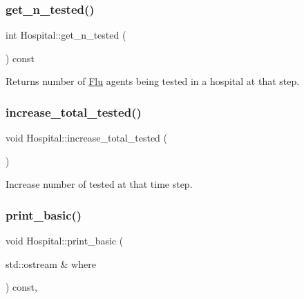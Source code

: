\mbox{\label{classHospital_ab7c68212de4e44986c8de732af160221}} 
\subsubsection{\texorpdfstring{get\+\_\+n\+\_\+tested()}{get\_n\_tested()}}
{\footnotesize\ttfamily int Hospital\+::get\+\_\+n\+\_\+tested (\begin{DoxyParamCaption}{ }\end{DoxyParamCaption}) const\hspace{0.3cm}{\ttfamily [inline]}}



Returns number of \hyperlink{classFlu}{Flu} agents being tested in a hospital at that step. 

\mbox{\label{classHospital_a2661ef21ce8561a28849d1be40e2ee50}} 
\subsubsection{\texorpdfstring{increase\+\_\+total\+\_\+tested()}{increase\_total\_tested()}}
{\footnotesize\ttfamily void Hospital\+::increase\+\_\+total\+\_\+tested (\begin{DoxyParamCaption}{ }\end{DoxyParamCaption})\hspace{0.3cm}{\ttfamily [inline]}}



Increase number of tested at that time step. 

\mbox{\label{classHospital_a3a1963886a9974663c2a3e82817f1a2b}} 
\subsubsection{\texorpdfstring{print\+\_\+basic()}{print\_basic()}}
{\footnotesize\ttfamily void Hospital\+::print\+\_\+basic (\begin{DoxyParamCaption}\item[{std\+::ostream \&}]{where }\end{DoxyParamCaption}) const\hspace{0.3cm}{\ttfamily [override]}, {\ttfamily [virtual]}}



